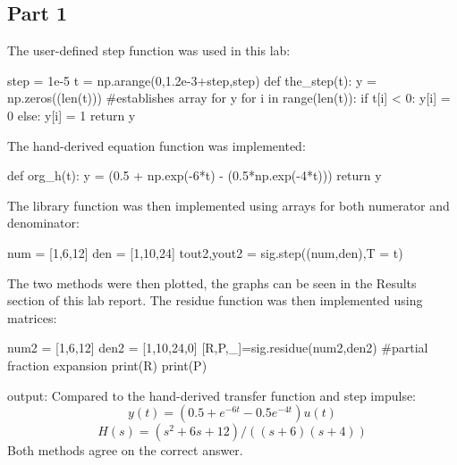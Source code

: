 \documentclass[12pt]{article}
\begin{document}
\subsection{Part 1}
The user-defined step function was used in this lab:
\begin{python}
step = 1e-5
t = np.arange(0,1.2e-3+step,step)
def the_step(t):
    y = np.zeros((len(t))) #establishes array for y
    for i in range(len(t)):
        if t[i] < 0:
             y[i] = 0 
        else:
             y[i] = 1
    return y
\end{python}  
The hand-derived equation function was implemented:
\begin{python}
def org_h(t):
    y = (0.5 + np.exp(-6*t) - (0.5*np.exp(-4*t)))
    return y
\end{python}
The library function was then implemented using arrays for both numerator and denominator:
\begin{python}
num = [1,6,12]
den = [1,10,24]
tout2,yout2 = sig.step((num,den),T = t)
\end{python}
The two methods were then plotted, the graphs can be seen in the Results section of this lab report.
The residue function was then implemented using matrices:
\begin{python}
num2 = [1,6,12]
den2 = [1,10,24,0]
[R,P,_]=sig.residue(num2,den2) #partial fraction expansion
print(R)
print(P)
\end{python}
output: \newline
[ 1.  -0.5  0.5]\newline
[-6. -4.  0.]\newline
Compared to the hand-derived transfer function and step impulse:
\[y(t) = (0.5 + e^{-6t} - 0.5e^{-4t})u(t)\]
\[H(s) = (s^2 + 6s + 12)/((s + 6)(s + 4))\]
Both methods agree on the correct answer.
\end{document}
